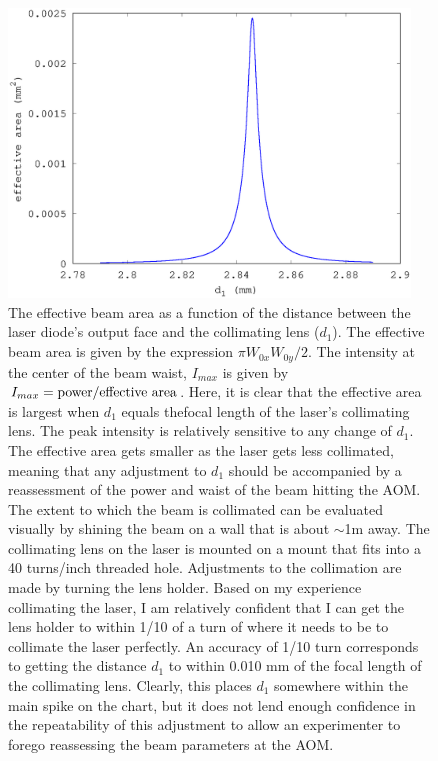 \begin{figure}
    \centerline{\includegraphics[width=0.95\textwidth]{waists2.eps}}
    \caption[]{\label{waists2.eps}
        The effective beam area as a function of the distance between the laser diode's output face and the collimating lens ($d_1$). The effective beam area is given by the expression $\pi W_{0x}W_{0y}/2$. The intensity at the center of the beam waist, $I_{max}$ is given by $I_{max}=\textnormal{power}/\textnormal{effective area}$. Here, it is clear that the effective area is largest when $d_1$ equals thefocal length of the laser's collimating lens. The peak intensity is relatively sensitive to any change of $d_1$. The effective area gets smaller as the laser gets less collimated, meaning that any adjustment to $d_1$ should be accompanied by a reassessment of the power and waist of the beam hitting the AOM. The extent to which the beam is collimated can be evaluated visually by shining the beam on a wall that is about $\sim$1m away. The collimating lens on the laser is mounted on a mount that fits into a 40 turns/inch threaded hole. Adjustments to the collimation are made by turning the lens holder.  Based on my experience collimating the laser, I am relatively confident that I can get the lens holder to within 1/10 of a turn of where it needs to be to collimate the laser perfectly.  An accuracy of 1/10 turn corresponds to getting the distance $d_1$ to within 0.010 mm of the focal length of the collimating lens. Clearly, this places $d_1$ somewhere within the main spike on the chart, but it does not lend enough confidence in the repeatability of this adjustment to allow an experimenter to forego reassessing the beam parameters at the AOM.}
\end{figure}
